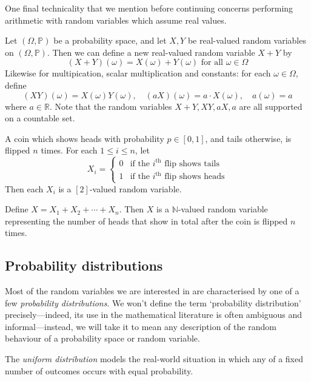 One final technicality that we mention before continuing concerns performing arithmetic with random variables which assume real values.

\begin{notation}
\label{ntnRandomVariableArithmetic}
Let $(\Omega,\mathbb{P})$ be a probability space, and let $X,Y$ be real-valued random variables on $(\Omega,\mathbb{P})$. Then we can define a new real-valued random variable $X+Y$ by
\[ (X+Y)(\omega) = X(\omega) + Y(\omega) \text{ for all } \omega \in \Omega \]
Likewise for multipication, scalar multiplication and constants: for each $\omega \in \Omega$, define
\[ (XY)(\omega) = X(\omega)Y(\omega), \quad (aX)(\omega) = a \cdot X(\omega), \quad a(\omega)=a \]
where $a \in \mathbb{R}$. Note that the random variables $X+Y, XY, aX, a$ are all supported on a countable set.
\end{notation}

\begin{example}
A coin which shows heads with probability $p \in [0,1]$, and tails otherwise, is flipped $n$ times. For each $1 \le i \le n$, let
\[ X_i = \begin{cases} 0 & \text{if the } i^{\text{th}} \text{ flip shows tails} \\
1 & \text{if the } i^{\text{th}} \text{ flip shows heads} \end{cases} \]
Then each $X_i$ is a $[2]$-valued random variable.

Define $X = X_1 + X_2 + \cdots + X_n$. Then $X$ is a $\mathbb{N}$-valued random variable representing the number of heads that show in total after the coin is flipped $n$ times.
\end{example}

\subsection*{Probability distributions}

Most of the random variables we are interested in are characterised by one of a few \textit{probability distributions}. We won't define the term `probability distribution' precisely---indeed, its use in the mathematical literature is often ambiguous and informal---instead, we will take it to mean any description of the random behaviour of a probability space or random variable.

The \textit{uniform distribution} models the real-world situation in which any of a fixed number of outcomes occurs with equal probability.

